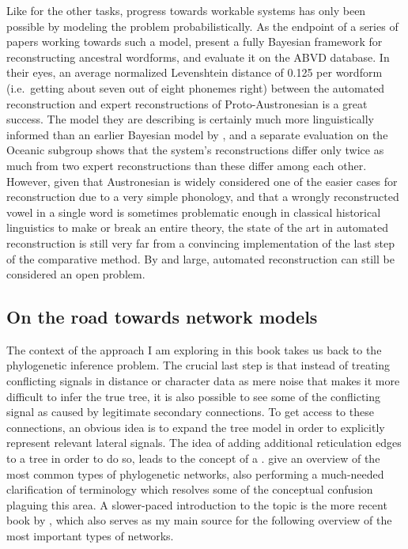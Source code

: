 Like for the other tasks, progress towards workable systems has only been possible by modeling the problem probabilistically. As the endpoint of a series of papers working towards such a model, \citet{bouchardcote_ea_2013} present a fully Bayesian framework for reconstructing ancestral wordforms, and evaluate it on the ABVD database. In their eyes, an average normalized Levenshtein distance of 0.125 per wordform (i.e.\ getting about seven out of eight phonemes right) between the automated reconstruction and expert reconstructions of Proto-Austronesian is a great success. The model they are describing is certainly much more linguistically informed than an earlier Bayesian model by \citet{ellison2007}, and a separate evaluation on the Oceanic subgroup shows that the system's reconstructions differ only twice as much from two expert reconstructions than these differ among each other. However, given that Austronesian is widely considered one of the easier cases for reconstruction due 
to a very simple phonology, and that a wrongly reconstructed vowel in a single word is sometimes problematic enough in classical historical linguistics to make or break an entire theory, the state of the art in automated reconstruction is still very far from a convincing implementation of the last step of the comparative method. By and large, automated reconstruction can still be considered an open problem.

\subsection{On the road towards network models}
The context of the approach I am exploring in this book takes us back to the phylogenetic inference problem. The crucial last step is that instead of treating conflicting signals in distance or character data as mere noise that makes it more difficult to infer the true tree, it is also possible to see some of the conflicting signal as caused by legitimate secondary connections. To get access to these connections, an obvious idea is to expand the tree model in order to explicitly represent relevant lateral signals. The idea of adding additional reticulation edges to a tree in order to do so, leads to the concept of a . \citet{huson_bryant_2006} give an overview of the most common types of phylogenetic networks, also performing a much-needed clarification of terminology which resolves some of the conceptual confusion plaguing this area. A slower-paced introduction to the topic is the more recent book by \citet{morrison2011}, which also serves as my main source for the following 
overview of the most important types of networks.

